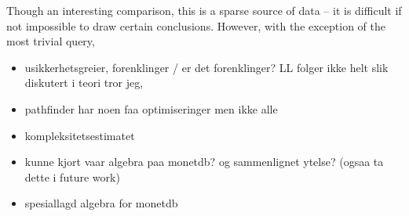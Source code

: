 Though an interesting comparison, this is a sparse source of data -- it
is difficult if not impossible to draw certain conclusions. However, with the
exception of the most trivial query, 


\begin{itemize} 
  \item usikkerhetsgreier, forenklinger / er det forenklinger? LL folger ikke
  helt slik diskutert i teori tror jeg, 
  \item pathfinder har noen faa optimiseringer men ikke alle
  \item kompleksitetsestimatet
  \item kunne kjort vaar algebra paa monetdb? og sammenlignet ytelse?
  (ogsaa ta dette i future work)
  \item spesiallagd algebra for monetdb
\end{itemize}